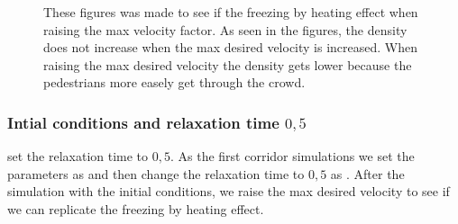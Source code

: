 \begin{figure}[h]
\centering
{}
\caption{These figures was made to see if the freezing by heating effect when raising the max velocity factor. As seen in the figures, the
density does not increase when the max desired velocity is increased. When raising the max desired velocity the density gets lower because
the pedestrians more easely get through the crowd.}
\label{fig:freezingbyheating1}
\end{figure}

\subsubsection{Intial conditions and relaxation time $0,5$}
\cite{helbing00} set the relaxation time to $0,5$. As the first corridor simulations we set the parameters as \cite{ABconstant}
and then change the relaxation time to $0,5$ as \cite{helbing00}. After the simulation with the initial conditions, we raise the
max desired velocity to see if we can replicate the freezing by heating effect.

